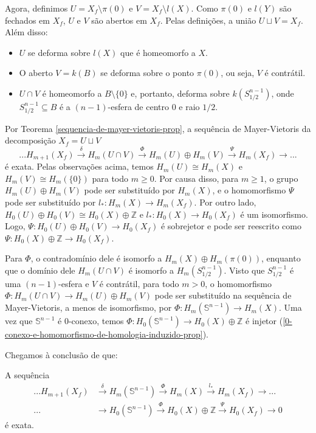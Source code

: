 Agora, definimos $U=X_f\setminus \pi(0)$ e $V=X_f\setminus l(X)$. Como $\pi(0)$ e $l(Y)$ são fechados em $X_f$, $U$ e $V$ são abertos em $X_f$. Pelas definições, a união $U\sqcup V=X_f$. Além disso:
\begin{itemize}
    \item $U$ se deforma sobre $l(X)$ que é homeomorfo a $X$.
    \item O aberto $V=k(B)$ se deforma sobre o ponto $\pi(0)$, ou seja, $V$ é contrátil.
    \item $U\cap V$ é homeomorfo a $B\setminus \{0\}$ e, portanto, deforma sobre $k(S^{n-1}_{1/2})$, onde $S^{n-1}_{1/2}\subseteq B$ é a $(n-1)$-esfera de centro 0 e raio $1/2$.
\end{itemize}
Por Teorema \ref{sequencia-de-mayer-vietoris-prop}, a sequência de Mayer-Vietoris da decomposição $X_f=U\sqcup V$ 
\[...H_{m+1}(X_f)\xrightarrow{\delta} H_m(U\cap V)\xrightarrow{\Phi}H_m(U)\oplus H_m(V)\xrightarrow{\Psi} H_m(X_f)\rightarrow ...\]
é exata. Pelas observações acima, temos $H_m(U)\cong H_m(X)$ e $H_m (V)\cong H_m(\{0\})$ para todo $m\ge 0$. Por causa disso, para $m\ge 1$, o grupo $H_m(U)\oplus H_m(V)$ pode ser substituído por $H_m(X)$, e o homomorfismo $\Psi$ pode ser substituído por $l_*:H_m(X)\rightarrow H_m (X_f)$. Por outro lado, $H_0(U)\oplus H_0 (V)\cong H_0(X)\oplus \mathbb{Z}$ e $l_*:H_0(X)\rightarrow H_0 (X_f)$ é um isomorfismo. Logo, $\Psi: H_0(U)\oplus H_0 (V)\rightarrow H_0 (X_f)$ é sobrejetor e pode ser reescrito como $\Psi:H_0(X)\oplus \mathbb{Z}\rightarrow H_0(X_f)$.

Para $\Phi$, o contradomínio dele é isomorfo a $H_m(X)\oplus H_m (\pi(0))$, enquanto que o domínio dele $H_m(U\cap V)$ é isomorfo a $H_m(S^{n-1}_{1/2})$. Visto que $S^{n-1}_{1/2}$ é uma $(n-1)$-esfera e $V$ é contrátil, para todo $m>0$, o homomorfismo $\Phi:H_m(U\cap V)\rightarrow H_m(U)\oplus H_m(V)$ pode ser substituído na sequência de Mayer-Vietoris, a menos de isomorfismo, por $\Phi:H_m(\mathbb{S}^{n-1})\rightarrow H_m(X)$. Uma vez que $\mathbb{S}^{n-1}$ é 0-conexo, temos $\Phi:H_0(\mathbb{S}^{n-1})\rightarrow H_0(X)\oplus\mathbb{Z}$ é injetor (\ref{0-conexo-e-homomorfismo-de-homologia-induzido-prop}).
    
Chegamos à conclusão de que: 
\begin{prop}
    A sequência 
    \begin{align*}
        ...H_{m+1}(X_f)&\xrightarrow{\delta} H_m(\mathbb{S}^{n-1})\xrightarrow{\Phi}H_m(X)\xrightarrow{l_*} H_m(X_f)\rightarrow ...\\
        ...& \rightarrow H_0 (\mathbb{S}^{n-1})\xrightarrow{\Phi} H_0(X)\oplus \mathbb{Z}\xrightarrow{\Psi} H_0(X_f)\rightarrow 0
    \end{align*}
    é exata.
\end{prop}

